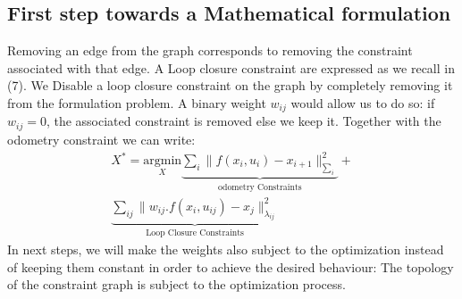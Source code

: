 \documentclass[9pt,technote]{IEEEtran}
\begin{document}
\subsection{First step towards a Mathematical formulation }
Removing an edge from the graph corresponds to removing the constraint associated with that edge. A Loop closure constraint are expressed as we recall in (7).
We Disable a loop closure constraint on the graph by completely removing it from the formulation problem.  A binary weight $w_{ij}$ would allow us to do so: if $w_{ij} = 0$, the associated constraint is removed else we keep it.
Together with the odometry constraint we can write: 
\begin{multline}
X^* = \underset{X}{\mathrm{argmin}} \underbrace{\sum_{i} \lVert f(x_{i},u_{i}) - x_{i+1} \rVert_{\sum_{i}}^{2}}_\text{odometry Constraints}  + \\
\underbrace{\sum_{ij} \lVert w_{ij}.f(x_{i},u_{ij}) - x_{j} \rVert_{\lambda_{ij}}^{2}}_\text{Loop Closure Constraints}
\end{multline}
In next steps, we will make the weights also subject to the optimization instead of keeping them constant in order to achieve the desired behaviour: The
topology of the constraint graph is subject to the optimization process.
\end{document}

